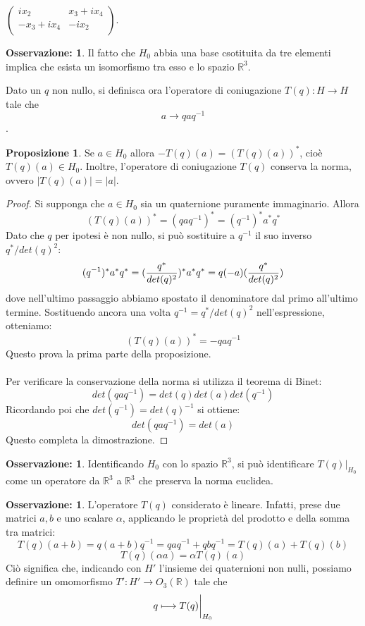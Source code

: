 \documentclass[12pt,a4paper]{report}
\theoremstyle{definition}
\newtheorem{Prop}[Def]{Proposizione}
\theoremstyle{definition}
\theoremstyle{definition}
\theoremstyle{definition}
\newtheorem{Obs}[Def]{Osservazione:}
\begin{document}
$\begin{pmatrix}
	ix_2 & x_3+ix_4\\
	-x_3+ix_4 & -ix_2\\
\end{pmatrix}$.
\begin{Obs}
	Il fatto che $H_0$ abbia una base csotituita da tre elementi implica che esista un isomorfismo tra esso e lo spazio $\mathbb{R}^3$.
\end{Obs}
Dato un $q$ non nullo, si definisca ora l'operatore di coniugazione
$T(q):H\longrightarrow H$ tale che
$$a\longrightarrow qaq^{-1}$$.
\begin{Prop}
	Se $a\in H_0$ allora $-T(q)(a)=(T(q)(a))^*$, cioè $T(q)(a)\in H_0$. Inoltre, l'operatore di coniugazione $T(q)$ conserva la norma, ovvero $|T(q)(a)|=|a|$.
\end{Prop}
\begin{proof}
	Si supponga che $a\in H_0$ sia un quaternione puramente immaginario. Allora $$(T(q)(a))^*=(qaq^{-1})^*=(q^{-1})^*a^*q^*$$
	Dato che $q$ per ipotesi è non nullo, si può sostituire a $q^{-1}$ il suo inverso $q^*/det(q)^2$:
	$$(q^{-1})^*a^*q^*=({q^*\over det(q)^2})^*a^*q^*=q(-a)({q^*\over det(q)^2})$$
	dove nell'ultimo passaggio abbiamo spostato il denominatore dal primo all'ultimo termine. Sostituendo ancora una volta $q^{-1}=q^*/det(q)^2$ nell'espressione, otteniamo:
	$$(T(q)(a))^*=-qaq^{-1}$$
	Questo prova la prima parte della proposizione.\\
	\\
	Per verificare la conservazione della norma si utilizza il teorema di Binet:
	$$det(qaq^{-1})=det(q)det(a)det(q^{-1})$$
	Ricordando poi che $det(q^{-1})=det(q)^{-1}$ si ottiene:
	$$det(qaq^{-1})=det(a)$$
	Questo completa la dimostrazione.
\end{proof}
\begin{Obs}
	Identificando $H_0$ con lo spazio $\mathbb{R}^3$, si può identificare $T(q)|_{H_0}$ come un operatore da $\mathbb{R}^3$ a $\mathbb{R}^3$ che preserva la norma euclidea.
\end{Obs}
\begin{Obs}
	L'operatore $T(q)$ considerato è lineare. Infatti, prese due matrici $a,b$ e uno scalare $\alpha$, applicando le proprietà del prodotto e della somma tra matrici: $$T(q)(a+b)=q(a+b)q^{-1}=qaq^{-1}+qbq^{-1}=T(q)(a)+T(q)(b)
	$$
	$$T(q)(\alpha a)=\alpha T(q)(a)$$
	Ciò significa che, indicando con $H'$ l'insieme dei quaternioni non nulli, possiamo definire un omomorfismo $T':H'\rightarrow O_3(\mathbb{R})$ tale che
	$$q\longmapsto T(q)\bigg{\rvert}_{H_0}$$
\end{Obs}
\end{document}
